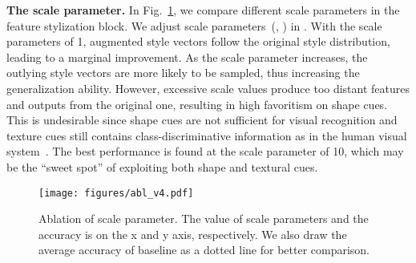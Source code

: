 \documentclass[sigconf]{acmart}
\newcommand{\Fref}[1]{Fig.~\ref{#1}}
\begin{document}
\begin{table}[t]
    \caption{Ablation study on each component.  denotes that stylized features are aggregated for cross-entropy loss~().}
    \label{tab:ablation loss}
    \centering
{}
\end{table}

\textbf{The scale parameter.}
In \Fref{fig:abl scale parameter}, we compare different scale parameters in the feature stylization block. We adjust scale parameters~(, ) in . With the scale parameters of 1, augmented style vectors follow the original style distribution, leading to a marginal improvement. As the scale parameter increases, the outlying style vectors are more likely to be sampled, thus increasing the generalization ability. However, excessive scale values produce too distant features and outputs from the original one, resulting in high favoritism on shape cues. This is undesirable since shape cues are not sufficient for visual recognition and texture cues still contains class-discriminative information as in the human visual system~\cite{sann2007perception}. The best performance is found at the scale parameter of 10, which may be the ``sweet spot'' of exploiting both shape and textural cues.

\begin{figure}
  \texttt{[image: figures/abl\_v4.pdf]}
  \caption{Ablation of scale parameter. The value of scale parameters and the accuracy is on the x and y axis, respectively. We also draw the average accuracy of baseline as a dotted line for better comparison.}
  \label{fig:abl scale parameter}
\end{figure}
\end{document}
